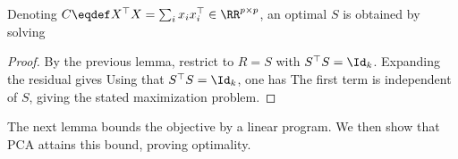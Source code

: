 \begin{lem}
	Denoting $C\eqdef X^\top X=\sum_i x_ix_i^\top\in\RR^{p\times p}$, an optimal $S$ is obtained by solving
\end{lem}
\begin{proof}
	By the previous lemma, restrict to $R=S$ with $S^\top S=\Id_k$. Expanding the residual gives
	Using that $S^\top S=\Id_k$, one has
The first term is independent of $S$, giving the stated maximization problem.
\end{proof}

The next lemma bounds the objective by a linear program. We then show that PCA attains this bound, proving optimality.

